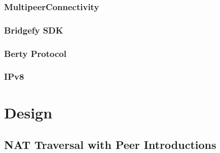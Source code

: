 \subsection{MultipeerConnectivity}

\subsection{Bridgefy SDK}

\subsection{Berty Protocol}

\subsection{IPv8}

\chapter{Design}


\section{NAT Traversal with Peer Introductions}






\clearpage

